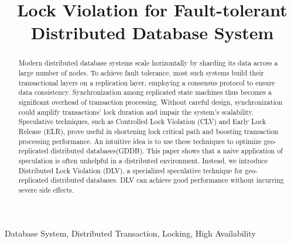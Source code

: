 \documentclass[conference]{IEEEtran}
\begin{document}
\title{Lock Violation for Fault-tolerant Distributed Database System}


\author{
\and
{}
\and
{}

}

\maketitle

\begin{abstract}
Modern distributed database systems scale horizontally by sharding its data across a large number of nodes.
To achieve fault tolerance, most such systems build their transactional layers on a replication layer,
employing a consensus protocol to ensure data consistency.
Synchronization among replicated state machines thus becomes a significant overhead of transaction processing.
Without careful design, synchronization could amplify transactions' lock duration and impair the system's scalability.
Speculative techniques, such as Controlled Lock Violation (CLV) and Early Lock Release (ELR), prove useful in shortening lock critical path and boosting transaction processing performance.
An intuitive idea is to use these techniques to optimize geo-replicated distributed databases(GDDB).
This paper shows that a naive application of speculation is often unhelpful in a distributed environment.
Instead, we introduce Distributed Lock Violation (DLV), a specialized speculative technique for geo-replicated distributed databases.
DLV can achieve good performance without incurring severe side effects.
\end{abstract}

\begin{IEEEkeywords}
Database System, Distributed Transaction, Locking, High Availability
\end{IEEEkeywords}
\end{document}
